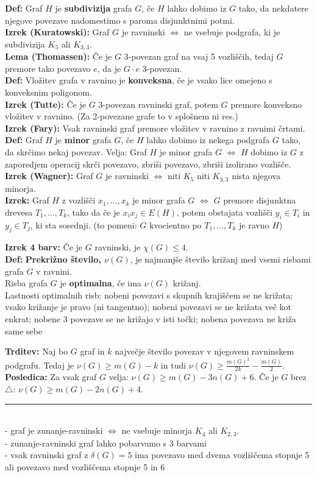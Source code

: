 \documentclass[a4paper,10pt]{article}
\theoremstyle{definition}
\let\oldtextbf\textbf
\renewcommand{\textbf}[1]{\oldtextbf{\boldmath #1}}
\newcommand{\rlsep}{\rule{0.5 \textwidth}{.1pt}}
\begin{document}
\textbf{Def:} Graf $H$ je \textbf{subdivizija} grafa $G$, če $H$ lahko dobimo iz $G$ tako, da nekdatere njegove povezave nadomestimo s paroma disjunktnimi potmi.\\
\textbf{Izrek (Kuratowski):} Graf $G$ je ravninski $\iff$ ne vsebuje podgrafa, ki je subdivizija $K_5$ ali $K_{3,3}$.\\
\textbf{Lema (Thomassen):} Če je $G$ 3-povezan graf na vsaj 5 vozliščih, tedaj $G$ premore tako povezavo $e$, da je $G \cdot e$ 3-povezan.\\
\textbf{Def:} Vložitev grafa v ravnino je \textbf{konveksna}, če je vsako lice omejeno s konveksnim poligonom.\\
\textbf{Izrek (Tutte):} Če je $G$ 3-povezan ravninski graf, potem $G$ premore konveksno vložitev v ravnino. (Za 2-povezane grafe to v splošnem ni res.)\\
\textbf{Izrek (Fary):} Vsak ravninski graf premore vložitev v ravnino z ravnimi črtami.\\
\textbf{Def:} Graf $H$ je \textbf{minor} grafa $G$, če $H$ lahko dobimo iz nekega podgrafa $G$ tako, da skrčimo nekaj povezav. Velja: Graf $H$ je minor grafa $G$ $\iff$ $H$ dobimo iz $G$ z zaporedjem operacij skrči povezavo, zbriši povezavo, zbriši izolirano vozlišče.\\
\textbf{Izrek (Wagner):} Graf $G$ je ravninski $\iff$ niti $K_5$ niti $K_{3,3}$ nista njegova minorja.\\
\textbf{Izrek:} Graf $H$ z vozlišči $x_1, \ldots, x_k$ je minor grafa $G$ $\iff$ $G$ premore disjunktna drevesa $T_1, \ldots, T_k$, tako da če je $x_i x_j \in  E(H)$, potem obstajata vozlišči $y_i \in T_i$ in $y_j \in T_j$, ki sta sosednji. (to pomeni: $G$ kvocientno po $T_1, \ldots, T_k$ je ravno $H$)

\textbf{Izrek 4 barv:} Če je $G$ ravninski, je $\chi(G) \leq 4$.\\
\textbf{Def:} \textbf{Prekrižno število, $\nu(G)$}, je najmanjše število križanj med vsemi risbami grafa $G$ v ravnini. \\ Risba grafa $G$ je \textbf{optimalna}, če ima $\nu(G)$ križanj.\\
Lastnosti optimalnih risb:
nobeni povezavi s skupnih krajiščem se ne križata;
vsako križanje je pravo (ni tangentno);
nobeni povezavi se ne križata več kot enkrat;
nobene 3 povezave se ne križajo v isti točki;
nobena povezava ne križa same sebe

\textbf{Trditev:} Naj bo $G$ graf in $k$ največje število povezav v njegovem ravninskem podgrafu. Tedaj je $\nu(G) \geq m(G) - k$ in tudi $\nu(G) \geq \frac{m(G)^2}{2k} - \frac{m(G)}{2}$.\\
\textbf{Posledica:} Za vsak graf $G$ velja: $\nu(G) \geq m(G) - 3 n(G) + 6$. Če je $G$ brez $\triangle$: $\nu(G) \geq m(G) - 2 n(G) + 4$.\\
\rlsep\\
- graf je zunanje-ravninski $\iff$ ne vsebuje minorja $K_4$ ali $K_{2,3}$.\\
- zunanje-ravninski graf lahko pobarvamo s 3 barvami\\
- vsak ravninski graf z $\delta(G) = 5$ ima povezavo med dvema vozliščema stopnje 5 ali povezavo med vozliščema stopnje 5 in 6
\end{document}
